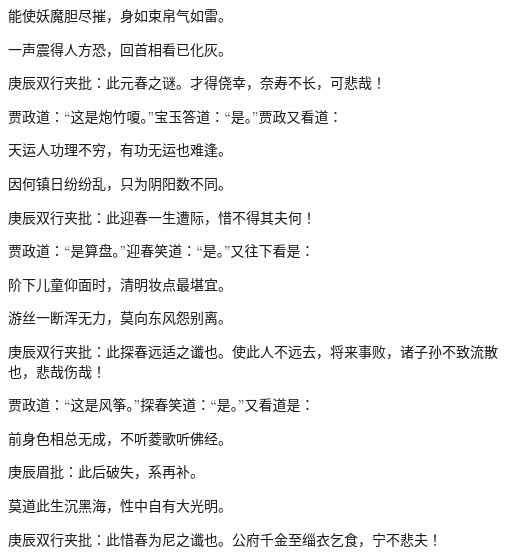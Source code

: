 \begin{poem}
    \begin{pl}能使妖魔胆尽摧，身如束帛气如雷。\end{pl}

    \begin{pl}一声震得人方恐，回首相看已化灰。\end{pl} \begin{note}庚辰双行夹批：此元春之谜。才得侥幸，奈寿不长，可悲哉！\end{note}
\end{poem}
\begin{parag}

    贾政道：“这是炮竹嗄。”宝玉答道：“是。”贾政又看道：
\end{parag}
\begin{poem}

    \begin{pl}天运人功理不穷，有功无运也难逢。\end{pl}

    \begin{pl}因何镇日纷纷乱，只为阴阳数不同。\end{pl}
    \begin{note}庚辰双行夹批：此迎春一生遭际，惜不得其夫何！\end{note}
\end{poem}
\begin{parag}

    贾政道：“是算盘。”迎春笑道：“是。”又往下看是：
\end{parag}
\begin{poem}

    \begin{pl}阶下儿童仰面时，清明妆点最堪宜。\end{pl}

    \begin{pl}游丝一断浑无力，莫向东风怨别离。\end{pl}
    \begin{note}庚辰双行夹批：此探春远适之谶也。使此人不远去，将来事败，诸子孙不致流散也，悲哉伤哉！\end{note}
\end{poem}
\begin{parag}

    贾政道：“这是风筝。”探春笑道：“是。”又看道是：
\end{parag}
\begin{poem}

    \begin{pl}前身色相总无成，不听菱歌听佛经。\end{pl}\begin{note}庚辰眉批：此后破失，系再补。\end{note}

    \begin{pl}莫道此生沉黑海，性中自有大光明。\end{pl}\begin{note}庚辰双行夹批：此惜春为尼之谶也。公府千金至缁衣乞食，宁不悲夫！ \end{note}
\end{poem}

